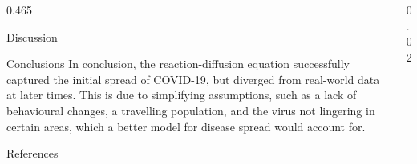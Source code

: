 \documentclass{beamer} %
\begin{document}
\begin{frame}[t]
\begin{columns}[t]
\begin{column}{0.465\textwidth}
\begin{block}{Discussion}
\end{block}


\begin{block}{Conclusions} 
	In conclusion, the reaction-diffusion equation successfully captured the initial spread of COVID-19, but diverged from real-world data at later times. This is due to simplifying assumptions, such as a lack of behavioural changes, a travelling population, and the virus not lingering in certain areas, which a better model for disease spread would account for.
\end{block}

\begin{block}{References}
	\small %
	\vspace{-1ex} %
\end{block}



\end{column} %

\begin{column}{0.02\textwidth}\end{column} %

\end{columns} %

\end{frame} %

\end{document}
